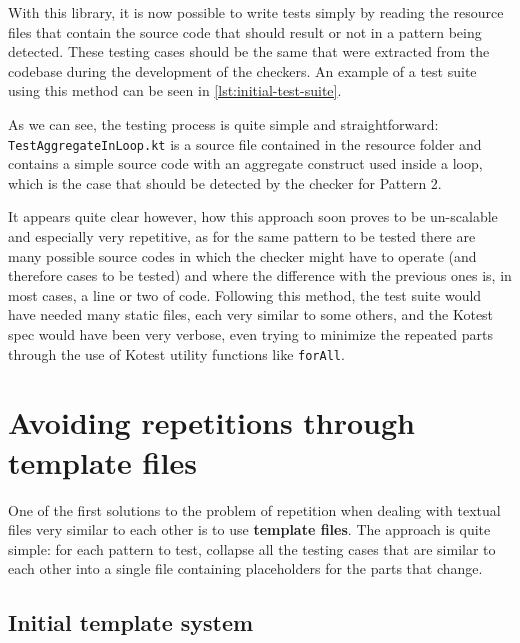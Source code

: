 \documentclass[12pt,a4paper,openright,twoside]{book}
\begin{document}
With this library, it is now possible to write tests simply by reading the
resource files that contain the source code that should result or not in a
pattern being detected. These testing cases should be the same that were
extracted from the codebase during the development of the checkers. An example
of a test suite using this method can be seen in \cref{lst:initial-test-suite}.
%

%
As we can see, the testing process is quite simple and straightforward:
\lstinline{TestAggregateInLoop.kt} is a source file contained in the resource
folder and contains a simple source code with an aggregate construct used inside
a loop, which is the case that should be detected by the checker for Pattern 2.

It appears quite clear however, how this approach soon proves to be un-scalable
and especially very repetitive, as for the same pattern to be tested there are
many possible source codes in which the checker might have to operate (and
therefore cases to be tested) and where the difference with the previous ones
is, in most cases, a line or two of code. 
%
Following this method, the test suite would have needed many static files, each
very similar to some others, and the Kotest spec would have been very verbose,
even trying to minimize the repeated parts through the use of Kotest utility
functions like \lstinline{forAll}.

\section{Avoiding repetitions through template files}

One of the first solutions to the problem of repetition when dealing with
textual files very similar to each other is to use \textbf{template files}. The
approach is quite simple: for each pattern to test, collapse all the testing
cases that are similar to each other into a single file containing placeholders
for the parts that change. 

\subsection{Initial template system}
\end{document}
